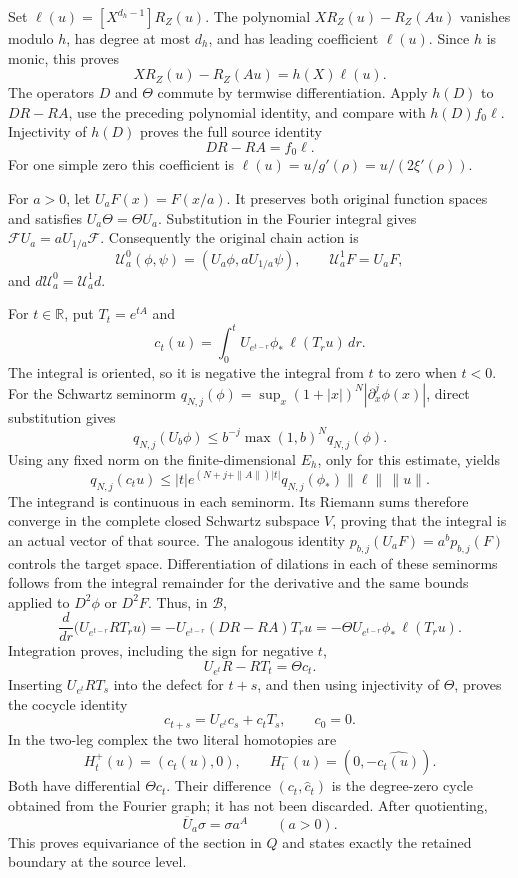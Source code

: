 Set \(\ell(u)=[X^{d_h-1}]R_Z(u)\).
The polynomial
\(XR_Z(u)-R_Z(Au)\) vanishes modulo \(h\), has
degree at most \(d_h\), and has leading coefficient
\(\ell(u)\). Since \(h\) is monic, this proves
\[
XR_Z(u)-R_Z(Au)=h(X)\ell(u).
\]
The operators \(D\) and \(\Theta\) commute by
termwise differentiation. Apply \(h(D)\) to
\(DR-RA\), use the preceding polynomial identity,
and compare with \(h(D)f_0\ell\). Injectivity of
\(h(D)\) proves the full source identity
\[
DR-RA=f_0\ell.
\]
For one simple zero this coefficient is
\(\ell(u)=u/g'(\rho)=u/(2\xi'(\rho))\).

For \(a>0\), let \(U_aF(x)=F(x/a)\).
It preserves both original function spaces and
satisfies \(U_a\Theta=\Theta U_a\).
Substitution in the Fourier integral gives
\(\mathcal F U_a=aU_{1/a}\mathcal F\).
Consequently the original chain action is
\[
\mathcal U_a^0(\phi,\psi)
=(U_a\phi,aU_{1/a}\psi),\qquad
\mathcal U_a^1F=U_aF,
\]
and \(d\mathcal U_a^0=\mathcal U_a^1d\).

For \(t\in\mathbb R\), put \(T_t=e^{tA}\) and
\[
c_t(u)=\int_0^t U_{e^{t-r}}\phi_*\,\ell(T_ru)\,dr.
\]
The integral is oriented, so it is negative the
integral from \(t\) to zero when \(t<0\).
For the Schwartz seminorm
\(q_{N,j}(\phi)=\sup_x(1+|x|)^N|\partial_x^j\phi(x)|\),
direct substitution gives
\[
q_{N,j}(U_b\phi)\le
b^{-j}\max(1,b)^Nq_{N,j}(\phi).
\]
Using any fixed norm on the finite-dimensional
\(E_h\), only for this estimate, yields
\[
q_{N,j}(c_tu)\le
|t|e^{(N+j+\|A\|)|t|}
q_{N,j}(\phi_*)\|\ell\|\,\|u\|.
\]
The integrand is continuous in each seminorm.
Its Riemann sums therefore converge in the complete
closed Schwartz subspace \(V\), proving that the
integral is an actual vector of that source.
The analogous identity
\(p_{b,j}(U_aF)=a^bp_{b,j}(F)\) controls the
target space. Differentiation of dilations in each
of these seminorms follows from the integral
remainder for the derivative and the same bounds
applied to \(D^2\phi\) or \(D^2F\).
Thus, in \(\mathscr B\),
\[
\frac{d}{dr}\bigl(U_{e^{t-r}}RT_ru\bigr)
=-U_{e^{t-r}}(DR-RA)T_ru
=-\Theta U_{e^{t-r}}\phi_*\,\ell(T_ru).
\]
Integration proves, including the sign for negative \(t\),
\[
U_{e^t}R-RT_t=\Theta c_t.
\]
Inserting \(U_{e^t}RT_s\) into the defect for
\(t+s\), and then using injectivity of \(\Theta\),
proves the cocycle identity
\[
c_{t+s}=U_{e^t}c_s+c_tT_s,\qquad c_0=0.
\]
In the two-leg complex the two literal homotopies
are
\[
H_t^+(u)=(c_t(u),0),\qquad
H_t^-(u)=(0,-\widehat{c_t(u)}).
\]
Both have differential \(\Theta c_t\).
Their difference
\((c_t,\widehat c_t)\) is the degree-zero cycle
obtained from the Fourier graph; it has not been
discarded. After quotienting,
\[
\overline U_a\sigma=\sigma a^A\qquad(a>0).
\]
This proves equivariance of the section in \(Q\)
and states exactly the retained boundary at the
source level.

